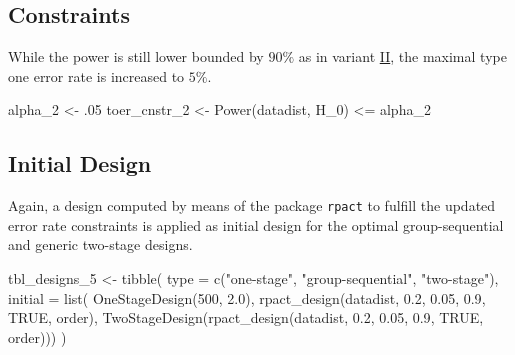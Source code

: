 \documentclass[
]{book}
\newenvironment{Shaded}{\begin{snugshade}}{\end{snugshade}}
\newcommand{\AttributeTok}[1]{\textcolor[rgb]{0.77,0.63,0.00}{#1}}
\newcommand{\ConstantTok}[1]{\textcolor[rgb]{0.00,0.00,0.00}{#1}}
\newcommand{\DecValTok}[1]{\textcolor[rgb]{0.00,0.00,0.81}{#1}}
\newcommand{\FloatTok}[1]{\textcolor[rgb]{0.00,0.00,0.81}{#1}}
\newcommand{\FunctionTok}[1]{\textcolor[rgb]{0.00,0.00,0.00}{#1}}
\newcommand{\NormalTok}[1]{#1}
\newcommand{\OtherTok}[1]{\textcolor[rgb]{0.56,0.35,0.01}{#1}}
\newcommand{\SpecialCharTok}[1]{\textcolor[rgb]{0.00,0.00,0.00}{#1}}
\newcommand{\StringTok}[1]{\textcolor[rgb]{0.31,0.60,0.02}{#1}}
\begin{document}
\hypertarget{constraints-9}{%
\subsection{Constraints}\label{constraints-9}}

While the power is still lower bounded by \(90\%\) as in variant \protect\hyperlink{variantIV_2}{II},
the maximal type one error rate is increased to \(5\%\).

\begin{Shaded}
\begin{Highlighting}[]
\NormalTok{alpha\_2      }\OtherTok{\textless{}{-}}\NormalTok{ .}\DecValTok{05}
\NormalTok{toer\_cnstr\_2 }\OtherTok{\textless{}{-}} \FunctionTok{Power}\NormalTok{(datadist, H\_0) }\SpecialCharTok{\textless{}=}\NormalTok{ alpha\_2}
\end{Highlighting}
\end{Shaded}

\hypertarget{initial-design-7}{%
\subsection{Initial Design}\label{initial-design-7}}

Again, a design computed by means of the package \texttt{rpact} to fulfill
the updated error rate constraints is applied as initial design for the
optimal group-sequential and generic two-stage designs.

\begin{Shaded}
\begin{Highlighting}[]
\NormalTok{tbl\_designs\_5 }\OtherTok{\textless{}{-}} \FunctionTok{tibble}\NormalTok{(}
    \AttributeTok{type    =} \FunctionTok{c}\NormalTok{(}\StringTok{"one{-}stage"}\NormalTok{, }\StringTok{"group{-}sequential"}\NormalTok{, }\StringTok{"two{-}stage"}\NormalTok{),}
    \AttributeTok{initial =} \FunctionTok{list}\NormalTok{(}
        \FunctionTok{OneStageDesign}\NormalTok{(}\DecValTok{500}\NormalTok{, }\FloatTok{2.0}\NormalTok{),}
        \FunctionTok{rpact\_design}\NormalTok{(datadist, }\FloatTok{0.2}\NormalTok{, }\FloatTok{0.05}\NormalTok{, }\FloatTok{0.9}\NormalTok{, }\ConstantTok{TRUE}\NormalTok{, order),}
        \FunctionTok{TwoStageDesign}\NormalTok{(}\FunctionTok{rpact\_design}\NormalTok{(datadist, }\FloatTok{0.2}\NormalTok{, }\FloatTok{0.05}\NormalTok{, }\FloatTok{0.9}\NormalTok{, }\ConstantTok{TRUE}\NormalTok{, order))) )}
\end{Highlighting}
\end{Shaded}
\end{document}
